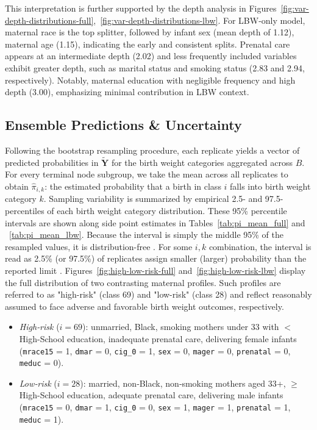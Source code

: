 This interpretation is further supported by the depth analysis in Figures~\ref{fig:var-depth-distributions-full},~\ref{fig:var-depth-distributions-lbw}. For LBW-only model, maternal race is the top splitter, followed by infant sex (mean depth of 1.12), maternal age (1.15), indicating the early and consistent splits. Prenatal care appears at an intermediate depth (2.02) and less frequently included variables exhibit greater depth, such as marital status and smoking status (2.83 and 2.94, respectively). Notably, maternal education with negligible frequency and high depth (3.00), emphasizing minimal contribution in LBW context. 


\subsection{Ensemble Predictions \& Uncertainty}
\label{sec:ch3-boot-pred}

Following the bootstrap resampling procedure, each replicate yields a vector of predicted probabilities in \(\tilde{\mathbf{Y}}\) for the birth weight categories aggregated across \(B\). For every terminal node subgroup, we take the mean across all replicates to obtain \(\hat{\pi}_{i,k}\): the estimated probability that a birth in class \(i\) falls into birth weight category \(k\). Sampling variability is summarized by empirical 2.5- and 97.5-percentiles of each birth weight category distribution. These 95\% percentile intervals are shown along side point estimates in Tables~\ref{tab:pi_mean_full} and ~\ref{tab:pi_mean_lbw}. Because the interval is simply the middle 95\% of the resampled values, it is distribution-free \parencite{percentile-interval}.  For some \(i,k\) combination, the interval is read as 2.5\% (or 97.5\%) of replicates assign smaller (larger) probability than the reported limit \parencite{percentile-interval}. Figures~\ref{fig:high-low-risk-full} and~\ref{fig:high-low-risk-lbw} display the full distribution of two contrasting maternal profiles.  Such profiles are referred to as "high-risk" (class 69) and "low-risk" (class 28) and reflect reasonably assumed to face adverse and favorable birth weight outcomes, respectively.

\begin{itemize}
  \item \emph{High‑risk} (\(i=69\)): unmarried, Black, smoking mothers under 33 with $<$ High-School education, inadequate prenatal care, delivering female infants (\texttt{mrace15} = 1, \texttt{dmar} = 0, \texttt{cig\_0} = 1, \texttt{sex} = 0, \texttt{mager} = 0, \texttt{prenatal} = 0, \texttt{meduc} = 0).
  \item \emph{Low‑risk} (\(i=28\)): married, non‑Black, non‑smoking mothers aged 33+, $\geq$ High-School education, adequate prenatal care, delivering male infants (\texttt{mrace15} = 0, \texttt{dmar} = 1, \texttt{cig\_0} = 0, \texttt{sex} = 1, \texttt{mager} = 1, \texttt{prenatal} = 1, \texttt{meduc} = 1).
\end{itemize}

